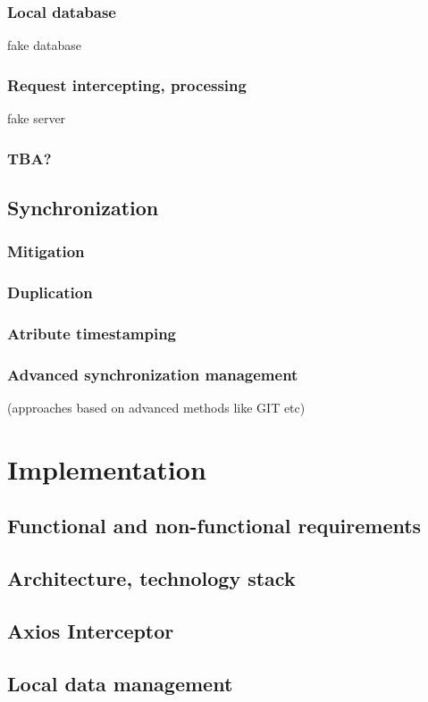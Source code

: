 \documentclass[
  digital,     %
  color,       %
  oneside,     %
  nosansbold,  %
  nocolorbold, %
  lof,         %
  lot,         %
]{fithesis4}
\begin{document}
\subsection{Local database}
fake database
\subsection{Request intercepting, processing}
fake server
\subsection{TBA?}
\section{Synchronization}
\subsection{Mitigation}
\subsection{Duplication}
\subsection{Atribute timestamping}
\subsection{Advanced synchronization management}
(approaches based on advanced methods like GIT etc)

\chapter{Implementation}
\section{Functional and non-functional requirements}
\section{Architecture, technology stack}
\section{Axios Interceptor}
\section{Local data management}
\end{document}
